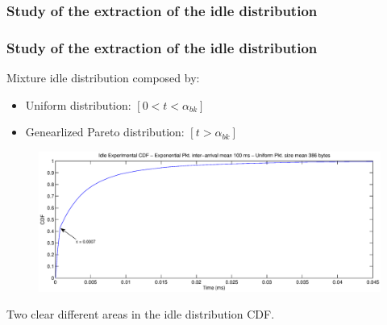\documentclass[9pt,handout,serif]{beamer}
\begin{document}
\subsubsection*{Study of the extraction of the idle distribution}
\begin{frame}[c]
 	\frametitle{Study of the extraction of the idle distribution}
	Mixture idle distribution composed by:
	\begin{itemize}
		\item Uniform distribution: $[0 < t < \alpha_{bk}]$
		\item Genearlized Pareto distribution: $[t > \alpha_{bk}]$
	\end{itemize}
	\begin{figure}
		\includegraphics[width=\textwidth]{../images/results/GlobalView/cdf_globalview}
	\end{figure}
	Two clear different areas in the idle distribution CDF.
\end{frame}
\end{document}
